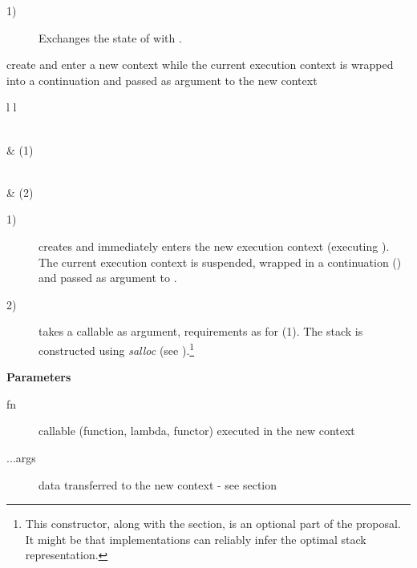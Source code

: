 \begin{description}
    \item[1)] Exchanges the state of  with .\\
\end{description}



create and enter a new context while the current execution context is wrapped
into a continuation and passed as argument to the new context\\

\begin{tabular}{ l l }
    \midrule

    \\
     & (1)\\

    \midrule

    \\
     & (2)\\

    \midrule
\end{tabular}

\begin{description}
    \item[1)] creates and immediately enters the new execution context
              (executing ). The current execution context is suspended,
              wrapped in a continuation (\cont) and passed as argument to
              .
    \item[2)] takes a callable as argument, requirements as for (1). The stack
              is constructed using \emph{salloc}
              (see ).\footnote{This constructor, along with
              the  section, is an optional part of the
              proposal. It might be that implementations can reliably infer the
              optimal stack representation.}
\end{description}

{\bfseries Parameters}
\begin{description}
    \item[fn]      callable (function, lambda, functor) executed in the new
                   context
    \item[...args] data transferred to the new context - see section
                   \\
\end{description}

